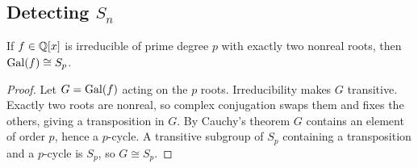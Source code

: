 \subsection{Detecting $S_n$}
\begin{proposition}
If $f\in\mathbb{Q}[x]$ is irreducible of prime degree $p$ with exactly two nonreal roots, then $\operatorname{Gal}(f)\cong S_p$.
\end{proposition}
\begin{proof}
Let $G=\operatorname{Gal}(f)$ acting on the $p$ roots.
Irreducibility makes $G$ transitive.
Exactly two roots are nonreal, so complex conjugation swaps them and fixes the others, giving a transposition in $G$.
By Cauchy's theorem $G$ contains an element of order $p$, hence a
$p$-cycle.
A transitive subgroup of $S_p$ containing a transposition and a $p$-cycle is $S_p$, so $G\cong S_p$.
\end{proof}

